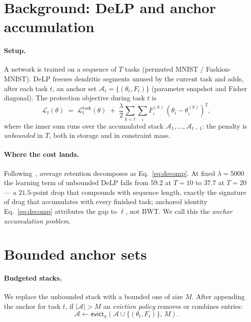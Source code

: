 \documentclass[review,11pt,number]{elsarticle}
\newcommand{\delp}{DeLP}
\begin{document}
\section{Background: \delp{} and anchor accumulation}
\label{sec:background}

\paragraph{Setup.}
A network is trained on a sequence of $T$ tasks (permuted MNIST /
Fashion-MNIST). \delp{} freezes dendritic segments unused by the
current task and adds, after each task $t$, an anchor set
$\mathcal{A}_t = \{(\theta_t, F_t)\}$ (parameter snapshot and Fisher
diagonal). The protection objective during task $t$ is
%
\begin{equation}
\label{eq:delp}
\mathcal{L}_t(\theta) \;=\; \mathcal{L}_t^{\text{task}}(\theta)
\;+\; \frac{\lambda}{2}\sum_{k<t}\sum_i F^{(k)}_i
      \,(\theta_i - \theta^{(k)}_i)^2 ,
\end{equation}
%
where the inner sum runs over the accumulated stack
$\mathcal{A}_1, \dots, \mathcal{A}_{t-1}$: the penalty is
\emph{unbounded} in $T$, both in storage and in constraint mass.

\paragraph{Where the cost lands.}
Following~\cite{zhou2026delp}, average retention decomposes as
Eq.~\ref{eq:decomp}.
At fixed $\lambda{=}5000$ the learning term of unbounded \delp{}
falls from $59.2$ at $T{=}10$ to $37.7$ at $T{=}20$ --- a
$21.5$-point drop that compounds with sequence length, exactly the
signature of drag that accumulates with every finished task;
anchored identity Eq.~\ref{eq:decomp} attributes the gap to $\ell$,
not BWT. We call this the \emph{anchor accumulation problem}.

\section{Bounded anchor sets}
\label{sec:method}

\paragraph{Budgeted stacks.}
We replace the unbounded stack with a bounded one of size $M$.
After appending the anchor for task $t$, if $|\mathcal{A}| > M$ an
\emph{eviction policy} removes or combines entries:
%
\begin{equation}
\label{eq:budget}
\mathcal{A} \leftarrow \mathsf{evict}_\pi\!\left(
\mathcal{A} \cup \{(\theta_t, F_t)\},\, M \right).
\end{equation}
\end{document}
